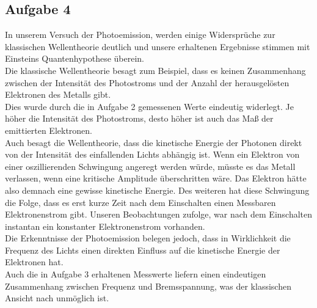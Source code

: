 \subsection{Aufgabe 4}

In unserem Versuch der Photoemission, werden einige Widersprüche zur klassischen Wellentheorie deutlich und unsere erhaltenen Ergebnisse stimmen mit Einsteins Quantenhypothese überein.\\

Die klassische Wellentheorie besagt zum Beispiel, dass es keinen Zusammenhang zwischen der Intensität des Photostroms und der Anzahl der herausgelösten Elektronen des Metalls gibt.\\
Dies wurde durch die in Aufgabe 2 gemessenen Werte eindeutig widerlegt. Je höher die Intensität des Photostroms, desto höher ist auch das Maß der emittierten Elektronen.\\
Auch besagt die Wellentheorie, dass die kinetische Energie der Photonen direkt von der Intensität des einfallenden Lichts abhängig ist. Wenn ein Elektron von einer oszillierenden Schwingung angeregt werden würde, müsste es das Metall verlassen, wenn eine kritische Amplitude überschritten wäre. Das Elektron hätte also demnach eine gewisse kinetische Energie. Des weiteren hat diese Schwingung die Folge, dass es erst kurze Zeit nach dem Einschalten einen Messbaren Elektronenstrom gibt. Unseren Beobachtungen zufolge, war nach dem Einschalten instantan ein konstanter Elektronenstrom vorhanden.\\
Die Erkenntnisse der Photoemission belegen jedoch, dass in Wirklichkeit die Frequenz des Lichts einen direkten Einfluss auf die kinetische Energie der Elektronen hat.\\
Auch die in Aufgabe 3 erhaltenen Messwerte liefern einen eindeutigen Zusammenhang zwischen Frequenz und Bremsspannung, was der klassischen Ansicht nach unmöglich ist.